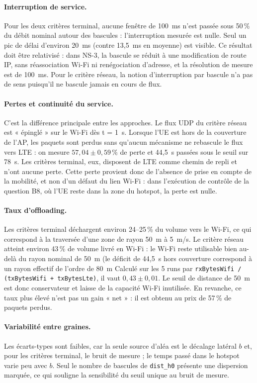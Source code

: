 \paragraph{Interruption de service.}
Pour les deux critères terminal, aucune fenêtre de 100~ms n'est passée sous
50\,\% du débit nominal autour des bascules : l'interruption mesurée est nulle.
Seul un pic de délai d'environ 20~ms (contre 13,5~ms en moyenne) est visible.
Ce résultat doit être relativisé : dans NS-3, la bascule se réduit à une
modification de route IP, sans réassociation Wi-Fi ni renégociation d'adresse,
et la résolution de mesure est de 100~ms. Pour le critère réseau, la notion
d'interruption par bascule n'a pas de sens puisqu'il ne bascule jamais en
cours de flux.

\paragraph{Pertes et continuité du service.}
C'est la différence principale entre les approches. Le flux UDP du critère
réseau est « épinglé » sur le Wi-Fi dès t = 1~s. Lorsque l'UE est hors de la
couverture de l'AP, les paquets sont perdus sans qu'aucun mécanisme ne
rebascule le flux vers LTE : on mesure $57{,}04 \pm 0{,}59$\,\% de perte et
44,5~s passées sous le seuil sur 78~s. Les critères terminal, eux, disposent de
LTE comme chemin de repli et n'ont aucune perte. Cette perte provient donc de
l'absence de prise en compte de la mobilité, et non d'un défaut du lien Wi-Fi :
dans l'exécution de contrôle de la question B8, où l'UE reste dans la zone du
hotspot, la perte est nulle.

\paragraph{Taux d'offloading.}
Les critères terminal déchargent environ 24--25\,\% du volume vers le Wi-Fi,
ce qui correspond à la traversée d'une zone de rayon 50~m à 5~m/s. Le critère
réseau atteint environ 43\,\% de volume livré en Wi-Fi : le Wi-Fi reste
utilisable bien au-delà du rayon nominal de 50~m (le déficit de 44,5~s hors
couverture correspond à un rayon effectif de l'ordre de 80~m
Calculé sur les 5 runs par \texttt{rxBytesWifi / (txBytesWifi + txBytesLte)}, il vaut $0{,}43 \pm 0{,}01$.
Le seuil de distance de 50~m est donc conservateur et laisse de la capacité
Wi-Fi inutilisée. En revanche, ce taux plus élevé n'est pas un gain « net » :
il est obtenu au prix de 57\,\% de paquets perdus.

\paragraph{Variabilité entre graines.}
Les écarts-types sont faibles, car la seule source d'aléa est le décalage
latéral $b$ et, pour les critères terminal, le bruit de mesure ; le temps
passé dans le hotspot varie peu avec $b$. Seul le nombre de bascules de
\texttt{dist\_h0} présente une dispersion marquée, ce qui souligne la
sensibilité du seuil unique au bruit de mesure.

